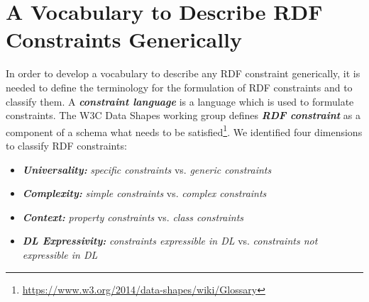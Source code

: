 \documentclass{llncs}
\begin{document}


\section{A Vocabulary to Describe RDF Constraints Generically} 
\label{sec:vocabulary}

In order to develop a vocabulary to describe any RDF constraint generically, it is needed to define the terminology for the formulation of RDF constraints and to classify them. 
A \textbf{\emph{constraint language}} is a language which is used to formulate constraints.
The W3C Data Shapes working group defines \textbf{\emph{RDF constraint}} as a component of a schema what needs to be satisfied\footnote{\url{https://www.w3.org/2014/data-shapes/wiki/Glossary}}.
We identified four dimensions to classify RDF constraints:
\begin{itemize}
  \item \textbf{\emph{Universality:}} \emph{specific constraints} vs. \emph{generic constraints}
	\item \textbf{\emph{Complexity:}} \emph{simple constraints} vs. \emph{complex constraints}
	\item \textbf{\emph{Context:}} \emph{property constraints} vs. \emph{class constraints}
	\item \textbf{\emph{DL Expressivity:}} \emph{constraints expressible in DL} vs. \emph{constraints not expressible in DL}
\end{itemize}
\end{document}
